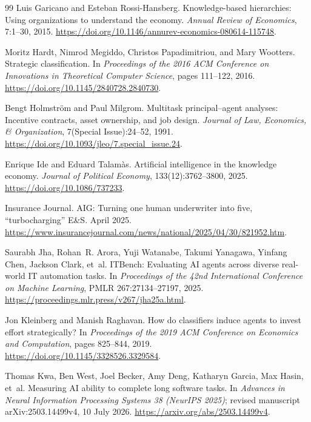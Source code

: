 \begin{thebibliography}{99}
Luis Garicano and Esteban Rossi-Hansberg.
\newblock Knowledge-based hierarchies: Using organizations to understand the economy.
\newblock \emph{Annual Review of Economics}, 7:1--30, 2015.
\newblock \url{https://doi.org/10.1146/annurev-economics-080614-115748}.

Moritz Hardt, Nimrod Megiddo, Christos Papadimitriou, and Mary Wootters.
\newblock Strategic classification.
\newblock In \emph{Proceedings of the 2016 ACM Conference on Innovations in Theoretical Computer
Science}, pages 111--122, 2016.
\newblock \url{https://doi.org/10.1145/2840728.2840730}.

Bengt Holmstr\"om and Paul Milgrom.
\newblock Multitask principal--agent analyses: Incentive contracts, asset ownership, and job design.
\newblock \emph{Journal of Law, Economics, \& Organization}, 7(Special Issue):24--52, 1991.
\newblock \url{https://doi.org/10.1093/jleo/7.special_issue.24}.

Enrique Ide and Eduard Talam\`as.
\newblock Artificial intelligence in the knowledge economy.
\newblock \emph{Journal of Political Economy}, 133(12):3762--3800, 2025.
\newblock \url{https://doi.org/10.1086/737233}.

Insurance Journal.
\newblock AIG: Turning one human underwriter into five, ``turbocharging'' E\&S.
 April 2025.
\newblock \url{https://www.insurancejournal.com/news/national/2025/04/30/821952.htm}.

Saurabh Jha, Rohan~R. Arora, Yuji Watanabe, Takumi Yanagawa, Yinfang Chen, Jackson Clark, et~al.
\newblock ITBench: Evaluating AI agents across diverse real-world IT automation tasks.
\newblock In \emph{Proceedings of the 42nd International Conference on Machine Learning}, PMLR
267:27134--27197, 2025.
\newblock \url{https://proceedings.mlr.press/v267/jha25a.html}.

Jon Kleinberg and Manish Raghavan.
\newblock How do classifiers induce agents to invest effort strategically?
\newblock In \emph{Proceedings of the 2019 ACM Conference on Economics and Computation}, pages
825--844, 2019.
\newblock \url{https://doi.org/10.1145/3328526.3329584}.

Thomas Kwa, Ben West, Joel Becker, Amy Deng, Katharyn Garcia, Max Hasin, et~al.
\newblock Measuring AI ability to complete long software tasks.
\newblock In \emph{Advances in Neural Information Processing Systems 38 (NeurIPS 2025)}; revised manuscript arXiv:2503.14499v4, 10 July 2026.
\newblock \url{https://arxiv.org/abs/2503.14499v4}.


\end{thebibliography}
